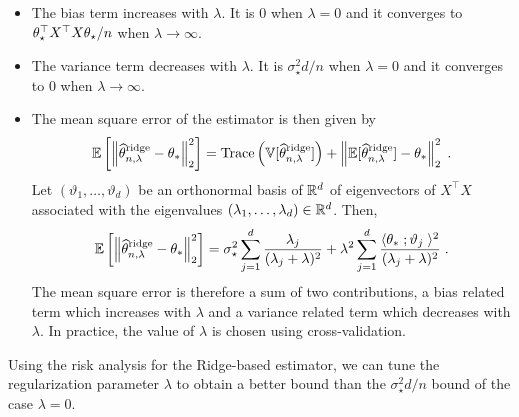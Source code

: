 \begin{remark}
\begin{itemize}
\item The bias term increases with $\lambda$. It is 0 when $\lambda = 0$ and it converges to $\theta_\star^\top X^\top X\theta_\star / n$ when $\lambda\to \infty$.
\item  The variance term decreases with $\lambda$. It is $\sigma_\star^2 d /n$ when $\lambda = 0$ and it converges to $0$ when $\lambda\to \infty$.
\item The mean square error of the estimator is then given by
\[
\mathbb{E}\left[\left\|\widehat {\theta}^{\mathrm{ridge}}_{n,\lambda}-\theta_*\right\|_2^2\right] = \mathrm{Trace}\left(\mathbb{V}[\widehat {\theta}^{\mathrm{ridge}}_{n,\lambda}]\right) + \left\|\mathbb{E}[\widehat {\theta}^{\mathrm{ridge}}_{n,\lambda}] - \theta_*\right\|_2^2\;.
\]
Let $(\vartheta_1,\ldots,\vartheta_d)$ be an orthonormal basis of $\mathbb{R}^d$ of eigenvectors of $X^\top X$ associated with the eigenvalues $(\lambda_1,\ldots,\lambda_d)\in\mathbb{R}^d$. Then,
\[
\mathbb{E}\left[\left\|\widehat {\theta}^{\mathrm{ridge}}_{n,\lambda}-\theta_*\right\|_2^2\right] =  \sigma_\star^2 \sum_{j=1}^d \frac{\lambda_j}{(\lambda_j+\lambda)^2} + \lambda^2  \sum_{j=1}^d \frac{\langle \theta_* \;; \vartheta_j\;\rangle^2}{(\lambda_j+\lambda)^2}\;.
\]
The mean square error is therefore a sum of two contributions, a bias related term which increases with $\lambda$ and a variance related term which decreases with $\lambda$. In practice, the value of $\lambda$ is chosen using cross-validation.
\end{itemize}
\end{remark}
Using the risk analysis for the Ridge-based estimator, we can tune the regularization parameter $\lambda$ to obtain
a  better bound than the $\sigma_\star^2 d /n$ bound of the case $\lambda = 0$.


